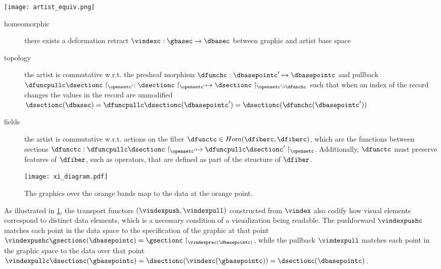 \documentclass[11pt,titlepage]{amsart}
\begin{document}
\begin{multicols}{2}
    \texttt{[image: artist\_equiv.png]}
    \label{fig:artist}
\columnbreak

\begin{description}
    \item[homeomorphic] there exists a deformation retract $\vindexc: \gbasec\rightarrow\dbasec$ between graphic and artist base space
    \item[topology] the artist is commutative w.r.t. the presheaf morphism $\dfunchc: \dbasepointc^{\prime}\mapsto \dbasepointc$ and pullback $\dfuncpullc \dsectionc \restriction_{\opensetc^{\prime}}: \dsectionc\restriction_{\opensetc^{\prime}} \mapsto \dsectionc \restriction_{\opensetc^{\prime} \circ \dfunchc}$ such that when an index of the record changes the values in the record are unmodified  $\dsectionc(\dbasec) = \dfuncpullc\dsectionc(\dbasepointc^{\prime}) = \dsectionc(\dfunchc(\dbasepointc^{\prime}))$
    \item[fields] the artist is commutative w.r.t. actions on the fiber $\dfunctc \in Hom(\dfiberc, \dfiberc)$, which are the functions between sections $\dfunctc: \dfuncpullc \dsectionc \restriction_{\opensetc^{\prime}} \mapsto \dfuncpullc \dsectionc^{\prime} \restriction_{\opensetc}$. Additionally, $\dfunctc$ must preserve features of $\dfiber$, such as operators, that are defined as part of the structure of $\dfiber$.

\end{description}
\end{multicols}

\begin{figure}[h]
    \texttt{[image: xi\_diagram.pdf]}
    \caption{The graphics over the orange bands map to the data at the orange point.}
    \label{fig:xi}
\end{figure}
As illustrated in \ref{fig:xi}, the transport functors $(\vindexpush, \vindexpull)$ constructed from $\vindex$ \cite{harder2008lectures} also codify how visual elements correspond to distinct data elements, which is a necessary condition of a visualization being readable\cite{ziemkiewiczEmbeddingInformationVisualization2009}. The pushforward $\vindexpushc$ matches each point in the data space to the specification of the graphic at that point $\vindexpushc\gsectionc(\dbasepointc) = \gsectionc\restriction_{\vindexprec(\dbasepointc)}$, while the pullback $\vindexpull$ matches each point in the graphic space to the data over that point $\vindexpullc\dsectionc(\gbasepointc) = \dsectionc(\vindexc(\gbasepointc)) = \dsectionc(\dbasepointc)$.
\end{document}
